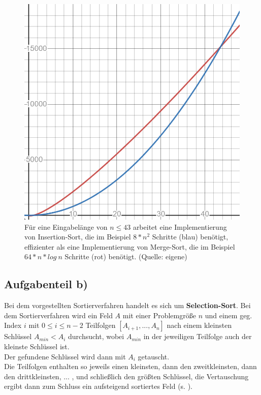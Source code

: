 \begin{figure}
    \begin{center}
        \includegraphics[scale=0.3]{chapters/7. Sortierverfahren/img/insertionvsmerge}
        \caption{Für eine Eingabelänge von $n\leq43$ arbeitet eine Implementierung von Insertion-Sort, die im Beispiel $8*n^2$ Schritte (blau) benötigt, effizienter als eine Implementierung von Merge-Sort, die im Beispiel $64*n*log\ n$ Schritte (rot) benötigt. (Quelle: eigene)}
        \label{fig:insertionvsmerge}
    \end{center}
\end{figure}

\subsection{Aufgabenteil b)}

Bei dem vorgestellten Sortierverfahren handelt es sich um \textbf{Selection-Sort}.
Bei dem Sortierverfahren wird ein Feld $A$ mit einer Problemgröße $n$ und einem geg. Index $i$ mit $ 0 \leq i \leq n - 2$ Teilfolgen $[A_{i+1}, ... , A_n]$ nach einem kleinsten Schlüssel $A_{min} < A_{i}$ durchsucht, wobei $A_{min}$ in der jeweiligen Teilfolge auch der kleinste Schlüssel ist.\\
Der gefundene Schlüssel wird dann mit $A_i$ getauscht.\\
Die Teilfolgen enthalten so jeweils einen kleinsten, dann den zweitkleinsten, dann den drittkleinsten, ... , und schließlich den größten Schlüssel, die Vertauschung ergibt dann zum Schluss ein aufsteigend sortiertes Feld (s. \cite[82]{OW17b}).


